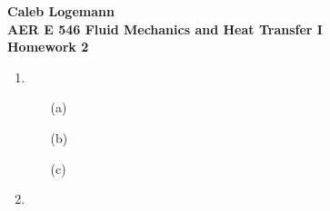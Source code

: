 \documentclass[11pt, oneside]{article}
\begin{document}
\noindent \textbf{\Large{Caleb Logemann \\
AER E 546 Fluid Mechanics and Heat Transfer I \\
Homework 2
}}

%
\begin{enumerate}
  \item %
    \begin{enumerate}
      \item[(a)]

      \item[(b)]
      \item[(c)]
    \end{enumerate}
  \item %
\end{enumerate}
\end{document}
